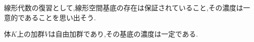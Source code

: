 線形代数の復習として,線形空間基底の存在は保証されていること,その濃度は一意的であることを思い出そう.
\begin{thm}
	体$K$上の加群$V$は自由加群であり,その基底の濃度は一定である.
\end{thm}
%		
%			
%			

